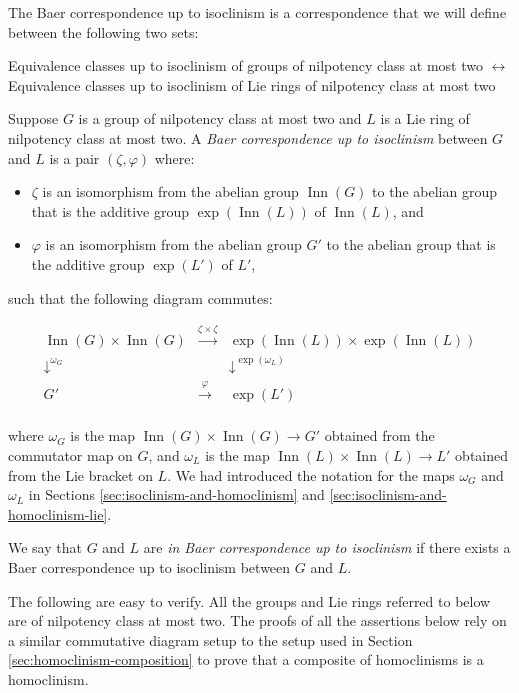 The Baer correspondence up to isoclinism is a correspondence that we
will define between the following two sets:

Equivalence classes up to isoclinism of groups of nilpotency class at
most two $\leftrightarrow$ Equivalence classes up to isoclinism of Lie rings of nilpotency class at most two

Suppose $G$ is a group of nilpotency class at most two and $L$ is a
Lie ring of nilpotency class at most two. A {\em Baer correspondence
  up to isoclinism} between $G$ and $L$ is a pair $(\zeta,\varphi)$
where:

\begin{itemize}
\item $\zeta$ is an isomorphism from the abelian group
  $\operatorname{Inn}(G)$ to the abelian group that is the additive
  group $\exp(\operatorname{Inn}(L))$ of $\operatorname{Inn}(L)$, and
\item $\varphi$ is an isomorphism from the abelian group $G'$ to the
  abelian group that is the additive group $\exp(L')$ of $L'$, 
\end{itemize}

such that the following diagram commutes:

$$\begin{array}{ccc}
  \operatorname{Inn}(G) \times \operatorname{Inn}(G) & \stackrel{\zeta \times \zeta}{\to} & \exp(\operatorname{Inn}(L)) \times \exp(\operatorname{Inn}(L)) \\
  \downarrow^{\omega_{G}}  & & \downarrow^{\exp(\omega_{L})}\\
  G' & \stackrel{\varphi}{\to} & \exp(L')\\
\end{array}$$

where $\omega_G$ is the map $\operatorname{Inn}(G) \times
\operatorname{Inn}(G) \to G'$ obtained from the commutator map on $G$,
and $\omega_L$ is the map $\operatorname{Inn}(L) \times
\operatorname{Inn}(L) \to L'$ obtained from the Lie bracket on $L$. We
had introduced the notation for the maps $\omega_G$ and $\omega_L$ in
Sections \ref{sec:isoclinism-and-homoclinism} and
\ref{sec:isoclinism-and-homoclinism-lie}.

We say that $G$ and $L$ are {\em in Baer correspondence up to
  isoclinism} if there exists a Baer correspondence up to isoclinism
between $G$ and $L$.

The following are easy to verify. All the groups and Lie rings
referred to below are of nilpotency class at most two. The proofs of
all the assertions below rely on a similar commutative diagram setup to
the setup used in Section \ref{sec:homoclinism-composition} to prove
that a composite of homoclinisms is a homoclinism.

